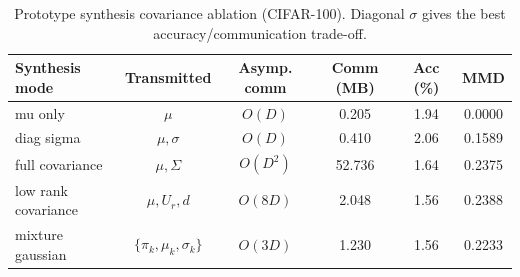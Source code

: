 \begin{table}[t]
\centering
\caption{Prototype synthesis covariance ablation (CIFAR-100). Diagonal $\sigma$ gives the best accuracy/communication trade-off.}
\label{tab:covariance}
\begin{tabular}{lccccc}
\toprule
Synthesis mode & Transmitted & Asymp. comm & Comm (MB) & Acc (\%) & MMD \\
\midrule
mu only & $\mu$ & $O(D)$ & 0.205 & 1.94 & 0.0000 \\
diag sigma & $\mu,\sigma$ & $O(D)$ & 0.410 & 2.06 & 0.1589 \\
full covariance & $\mu,\Sigma$ & $O(D^2)$ & 52.736 & 1.64 & 0.2375 \\
low rank covariance & $\mu,U_r,d$ & $O(8D)$ & 2.048 & 1.56 & 0.2388 \\
mixture gaussian & $\{\pi_k,\mu_k,\sigma_k\}$ & $O(3D)$ & 1.230 & 1.56 & 0.2233 \\
\bottomrule
\end{tabular}
\end{table}
